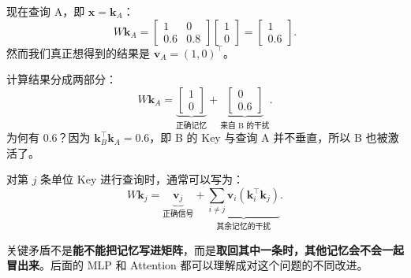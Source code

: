 \documentclass[11pt,a4paper,UTF8]{ctexart}
\numberwithin{equation}{section}
\newcommand{\vect}[1]{\boldsymbol{#1}}
\begin{document}
现在查询 A，即 $\vect{x}=\vect{k}_A$：
\begin{equation}
W\vect{k}_A=
\begin{bmatrix}1&0\\0.6&0.8\end{bmatrix}
\begin{bmatrix}1\\0\end{bmatrix}
=\begin{bmatrix}1\\0.6\end{bmatrix}.
\end{equation}
然而我们真正想得到的结果是 $\vect{v}_A=(1,0)^\top$。

\begin{example}
计算结果分成两部分：
\[
W\vect{k}_A=\underbrace{\begin{bmatrix}1\\0\end{bmatrix}}_{\text{正确记忆}}
+\underbrace{\begin{bmatrix}0\\0.6\end{bmatrix}}_{\text{来自 B 的干扰}}.
\]
为何有 $0.6$？因为 $\vect{k}_B^\top\vect{k}_A=0.6$，即 B 的 Key 与查询 A 并不垂直，所以 B 也被激活了。
\end{example}

\begin{center}
\end{center}

对第 $j$ 条单位 Key 进行查询时，通常可以写为：
\begin{equation}
W\vect{k}_j=
\underbrace{\vect{v}_j}_{\text{正确信号}}
+\underbrace{\sum_{i\ne j}\vect{v}_i(\vect{k}_i^\top\vect{k}_j)}_{\text{其余记忆的干扰}}.
\end{equation}

\begin{conclusion}
关键矛盾不是\textbf{能不能把记忆写进矩阵}，而是\textbf{取回其中一条时，其他记忆会不会一起冒出来}。后面的 MLP 和 Attention 都可以理解成对这个问题的不同改进。
\end{conclusion}
\end{document}
